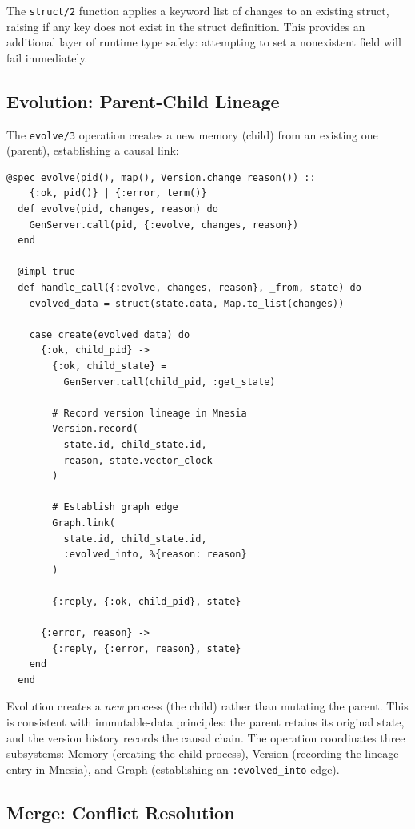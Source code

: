 \documentclass[12pt,a4paper]{article}
\theoremstyle{definition}
\begin{document}
The \texttt{struct/2} function applies a keyword list of changes to an existing struct, raising if any key does not exist in the struct definition.
This provides an additional layer of runtime type safety: attempting to set a nonexistent field will fail immediately.

\subsection{Evolution: Parent-Child Lineage}\label{subsec:evolution}

The \texttt{evolve/3} operation creates a new memory (child) from an existing one (parent), establishing a causal link:

\begin{lstlisting}[caption={Memory evolution with causal tracking.}, label={lst:evolve}]
  @spec evolve(pid(), map(), Version.change_reason()) ::
    {:ok, pid()} | {:error, term()}
  def evolve(pid, changes, reason) do
    GenServer.call(pid, {:evolve, changes, reason})
  end

  @impl true
  def handle_call({:evolve, changes, reason}, _from, state) do
    evolved_data = struct(state.data, Map.to_list(changes))

    case create(evolved_data) do
      {:ok, child_pid} ->
        {:ok, child_state} =
          GenServer.call(child_pid, :get_state)

        # Record version lineage in Mnesia
        Version.record(
          state.id, child_state.id,
          reason, state.vector_clock
        )

        # Establish graph edge
        Graph.link(
          state.id, child_state.id,
          :evolved_into, %{reason: reason}
        )

        {:reply, {:ok, child_pid}, state}

      {:error, reason} ->
        {:reply, {:error, reason}, state}
    end
  end
\end{lstlisting}

Evolution creates a \emph{new} process (the child) rather than mutating the parent.
This is consistent with immutable-data principles: the parent retains its original state, and the version history records the causal chain.
The operation coordinates three subsystems: Memory (creating the child process), Version (recording the lineage entry in Mnesia), and Graph (establishing an \texttt{:evolved\_into} edge).

\subsection{Merge: Conflict Resolution}\label{subsec:merge}
\end{document}
